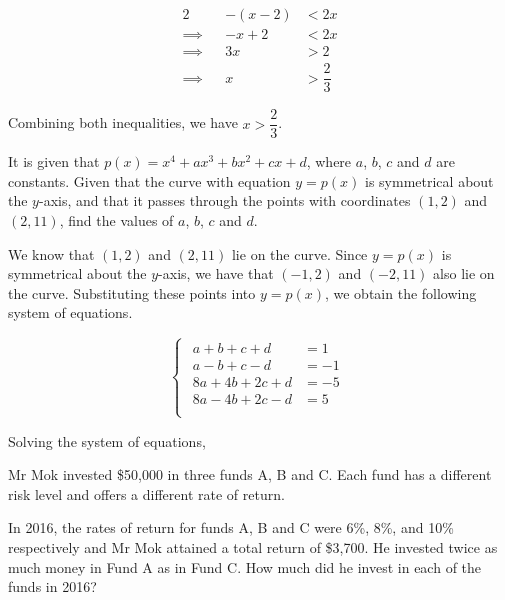 \documentclass{jhwhw}
\begin{document}
                \begin{alignat*}{2}
                    &&-(x-2) &< 2x \\
                    \implies&& -x + 2 &< 2x\\
                    \implies&& 3x &> 2\\
                    \implies&& x &> \dfrac23
                \end{alignat*}

            Combining both inequalities, we have $x > \dfrac23$.


    \problem{}
        It is given that $p(x) = x^4 + ax^3 + bx^2 + cx + d$, where $a$, $b$, $c$ and $d$ are constants. Given that the curve with equation $y = p(x)$ is symmetrical about the $y$-axis, and that it passes through the points with coordinates $(1,2)$ and $(2,11)$, find the values of $a$, $b$, $c$ and $d$.

    \solution
        We know that $(1,2)$ and $(2,11)$ lie on the curve. Since $y = p(x)$ is symmetrical about the $y$-axis, we have that $(-1,2)$ and $(-2,11)$ also lie on the curve. Substituting these points into $y = p(x)$, we obtain the following system of equations.

        \begin{equation*}
            \begin{cases}
                \begin{aligned}
                    a+b+c+d &= 1\\
                    a-b+c-d &= -1\\
                    8a+4b+2c+d &= -5\\
                    8a-4b+2c-d &= 5\\
                \end{aligned}
            \end{cases}
        \end{equation*}

        Solving the system of equations,

        

    \problem{}
        Mr Mok invested \$50,000 in three funds A, B and C. Each fund has a different risk level and offers a different rate of return.

        In 2016, the rates of return for funds A, B and C were 6\%, 8\%, and 10\% respectively and Mr Mok attained a total return of \$3,700. He invested twice as much money in Fund A as in Fund C. How much did he invest in each of the funds in 2016?
\end{document}
